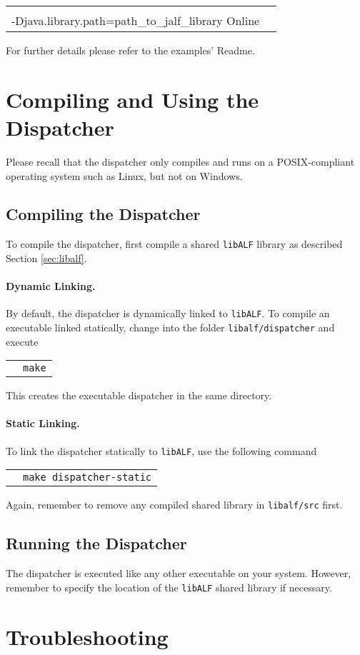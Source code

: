 \documentclass[a4paper, fontsize=11pt, DIV=12, parskip=half]{scrartcl}
\newcommand{\libalf}{\texttt{libALF}\xspace}
\newcommand{\cmd}[1]{
\begin{tabular}{p{.025\textwidth}l}
&\begin{minipage}{.85\textwidth}\texttt{#1}\end{minipage}
\end{tabular}
}
\begin{document}
\cmd{java -classpath "path\_to\_jalf/jalf.jar;." \\\phantom{java }-Djava.library.path=path\_to\_jalf\_library Online}

For further details please refer to the examples' Readme.

\section{Compiling and Using the Dispatcher}\label{sec:dispatcher}
Please recall that the dispatcher only compiles and runs on a POSIX-compliant operating system such as Linux, but not on Windows.

\subsection{Compiling the Dispatcher}
To compile the dispatcher, first compile a shared \libalf library as described Section \ref{sec:libalf}.

\paragraph{Dynamic Linking.}
By default, the dispatcher is dynamically linked to \libalf. To compile an executable linked statically, change into the folder \texttt{libalf/dispatcher} and execute

\cmd{make}

This creates the executable dispatcher in the same directory. 

\paragraph{Static Linking.}
To link the dispatcher statically to \libalf, use the following command

\cmd{make dispatcher-static}

Again, remember to remove any compiled shared library in \texttt{libalf/src} first.

\subsection{Running the Dispatcher}
The dispatcher is executed like any other executable on your system. However, remember to specify the location of the \libalf shared library if necessary.


\section{Troubleshooting}
\end{document}
